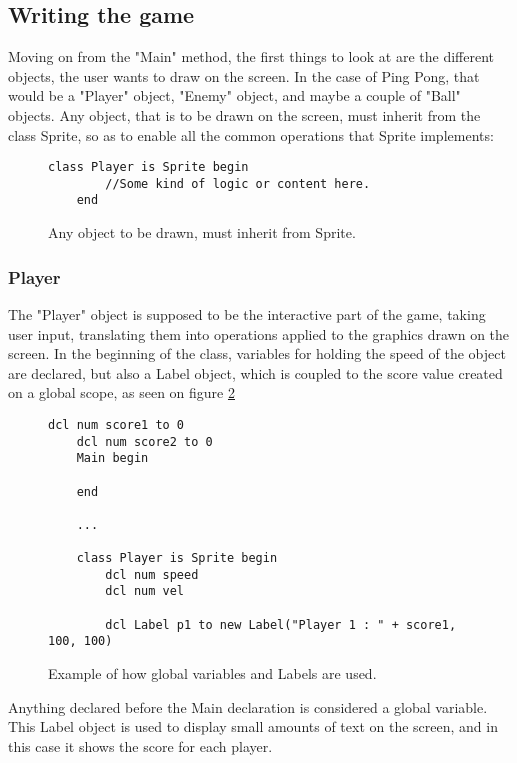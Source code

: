 \subsection{Writing the game}
Moving on from the "Main" method, the first things to look at are the different objects, the user wants to draw on the screen. In the case of Ping Pong, that would be a "Player" object, "Enemy" object, and maybe a couple of "Ball" objects. Any object, that is to be drawn on the screen, must inherit from the \lang{} class Sprite, so as to enable all the common operations that Sprite implements:
\begin{figure}[H]
    \centering
    \begin{lstlisting}[style=gglang]
    class Player is Sprite begin
        //Some kind of logic or content here.
    end
    \end{lstlisting}
    \caption{Any object to be drawn, must inherit from Sprite.}
    \label{fig:objdrawinherit}
\end{figure}


\subsubsection{Player}
The "Player" object is supposed to be the interactive part of the game, taking user input, translating them into operations applied to the graphics drawn on the screen. In the beginning of the class, variables for holding the speed of the object are declared, but also a Label object, which is coupled to the score value created on a global scope, as seen on figure \ref{fig:tutglobal}

\begin{figure}[H]
    \centering
    \begin{lstlisting}[style=gglang]
    dcl num score1 to 0
    dcl num score2 to 0
    Main begin
    
    end
    
    ...
    
    class Player is Sprite begin
        dcl num speed
        dcl num vel
    
        dcl Label p1 to new Label("Player 1 : " + score1, 100, 100)

    \end{lstlisting}
    \caption{Example of how global variables and Labels are used.}\label{fig:tutglobal}
\end{figure}
Anything declared before the Main declaration is considered a global variable. This Label object is used to display small amounts of text on the screen, and in this case it shows the score for each player. 

